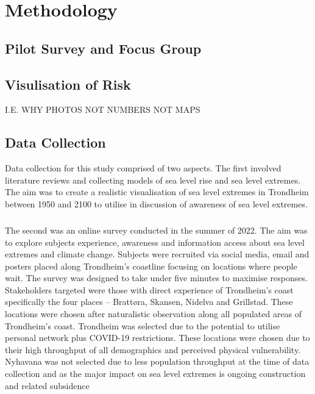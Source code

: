 


\chapter{Methodology}
\section{Pilot Survey and Focus Group}

\section{Visulisation of Risk}
I.E. WHY PHOTOS NOT NUMBERS NOT MAPS 

\section{Data Collection}

Data collection for this study comprised of two aspects.  The first involved literature reviews and collecting models of sea level rise and sea level extremes. The aim was to create a realistic visualisation of sea level extremes in Trondheim between 1950 and 2100 to utilise in discussion of awareness of sea level extremes. 
    \paragraph{}
The second was an online survey conducted in the summer of 2022. The aim was to explore subjects experience, awareness and information access about sea level extremes and climate change. Subjects were recruited via social media, email and posters placed along Trondheim’s coastline focusing on locations where people wait. The survey was designed to take under five minutes to maximise responses. Stakeholders targeted were those with direct experience of Trondheim’s coast specifically the four places – Brattøra, Skansen, Nidelva and Grillstad. These locations were chosen after naturalistic observation along all populated areas of Trondheim’s coast. Trondheim was selected due to the potential to utilise personal network plus COVID-19 restrictions. These locations were chosen due to their high throughput of all demographics and perceived physical vulnerability. Nyhavana was not selected due to less population throughput at the time of data collection and as the major impact on sea level extremes is ongoing construction and related subsidence \cite{miljoenheten_og_byplankontoret_trondheim_kommune_9-notat-om-havnivastigning-og-stormflo---hensyn-i-arealplanlegging-nyhavnapdf_2020}



